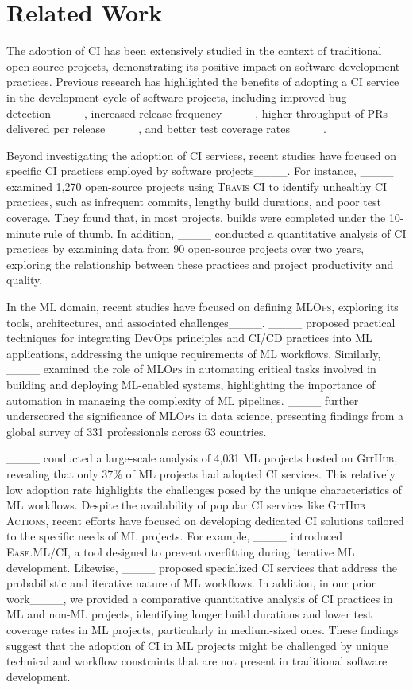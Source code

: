 \section{Related Work}
The adoption of CI has been extensively studied in the context of traditional open-source projects, demonstrating its positive impact on software development practices. 
Previous research has highlighted the benefits of adopting a CI service in the development cycle of software projects, including improved bug detection____, increased release frequency____, higher throughput of PRs delivered per release____, and better test coverage rates____. 

Beyond investigating the adoption of CI services, recent studies have focused on specific CI practices employed by software projects____. For instance, ____ examined 1,270 open-source projects using \textsc{Travis CI} to identify unhealthy CI practices, such as infrequent commits, lengthy build durations, and poor test coverage. They found that, in most projects, builds were completed under the 10-minute rule of thumb. In addition, ____ conducted a quantitative analysis of CI practices by examining data from 90 open-source projects over two years, exploring the relationship between these practices and project productivity and quality.

In the ML domain, recent studies have focused on defining \textsc{MLOps}, exploring its tools, architectures, and associated challenges____. ____ proposed practical techniques for integrating DevOps principles and CI/CD practices into ML applications, addressing the unique requirements of ML workflows. Similarly, ____ examined the role of \textsc{MLOps} in automating critical tasks involved in building and deploying ML-enabled systems, highlighting the importance of automation in managing the complexity of ML pipelines. ____ further underscored the significance of \textsc{MLOps} in data science, presenting findings from a global survey of 331 professionals across 63 countries.

____ conducted a large-scale analysis of 4,031 ML projects hosted on \textsc{GitHub}, revealing that only 37\% of ML projects had adopted CI services. This relatively low adoption rate highlights the challenges posed by the unique characteristics of ML workflows. Despite the availability of popular CI services like \textsc{GitHub Actions}, recent efforts have focused on developing dedicated CI solutions tailored to the specific needs of ML projects. For example, ____ introduced \textsc{Ease.ML/CI}, a tool designed to prevent overfitting during iterative ML development. Likewise, ____ proposed specialized CI services that address the probabilistic and iterative nature of ML workflows.
In addition, in our prior work____, we provided a comparative quantitative analysis of CI practices in ML and non-ML projects, identifying longer build durations and lower test coverage rates in ML projects, particularly in medium-sized ones. 
These findings suggest that the adoption of CI in ML projects might be challenged by unique technical and workflow constraints that are not present in traditional software development.

